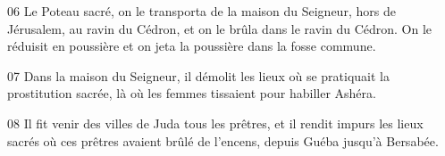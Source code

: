 
06 Le Poteau sacré, on le transporta de la maison du Seigneur, hors de Jérusalem, au ravin du Cédron, et on le brûla dans le ravin du Cédron. On le réduisit en poussière et on jeta la poussière dans la fosse commune.

07 Dans la maison du Seigneur, il démolit les lieux où se pratiquait la prostitution sacrée, là où les femmes tissaient pour habiller Ashéra.

08 Il fit venir des villes de Juda tous les prêtres, et il rendit impurs les lieux sacrés où ces prêtres avaient brûlé de l’encens, depuis Guéba jusqu’à Bersabée.